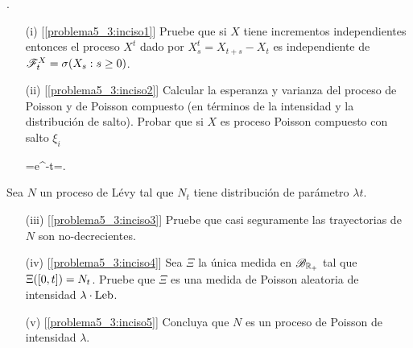 \begin{problema}.\pn
	
	\begin{enumerate}
		\item[(i)]		[\ref{problema5_3:inciso1}]
			Pruebe que si $X$ tiene incrementos independientes entonces el proceso $X^t$ dado por $X^t_s=X_{t+s}-X_t$ 
			es independiente de $\mathscr{F}^X_t=\sigma\!\left( X_s:s\geq 0\right) $.

		\item[(ii)]		[\ref{problema5_3:inciso2}]
			Calcular la esperanza y varianza del proceso de Poisson y de Poisson compuesto (en t\'erminos de 
			la intensidad y la distribuci\'on de salto). Probar que si $X$ es proceso Poisson compuesto con salto $\xi_i$
			\begin{esn}
				=e^{-\lambda t}\quad{}\quad {}=. 
			\end{esn}
	\end{enumerate}\pn
		Sea $N$ un proceso de L\'evy tal que $N_t$ tiene distribuci\'on de par\'ametro $\lambda t$. 

	\begin{enumerate}[resume]
		\item[(iii)]	[\ref{problema5_3:inciso3}] 
			Pruebe que casi seguramente las trayectorias de $N$ son no-decrecientes.
		\item[(iv)]		[\ref{problema5_3:inciso4}] 
			Sea $\Xi$ la \'unica medida en $\mathscr{B}_{\mathbb{R}_+}$ tal que $\Xi\!\left( [0,t]\right) =N_t$. Pruebe que 
			$\Xi$ es una medida de Poisson aleatoria de intensidad $\lambda \cdot\text{Leb}$.
		\item[(v)]		[\ref{problema5_3:inciso5}]
			Concluya que $N$ es un proceso de Poisson de intensidad $\lambda$. 
	\end{enumerate}
\end{problema}

